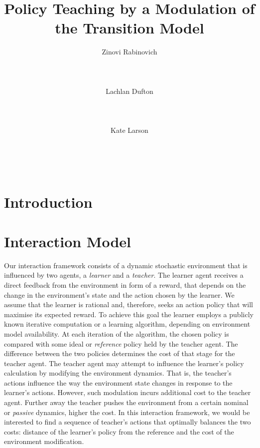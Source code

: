\documentclass[letterpaper]{aamas2009}
\author{\alignauthor Zinovi Rabinovich\\
  \affaddr{Electronics and Computer Science}\\
  \affaddr{University of Southampton}\\
  \affaddr{Southampton, United Kingdom}\\
  \email{zr@ecs.soton.ac.uk}
\alignauthor Lachlan Dufton\\ 
  \affaddr{Cheriton School of Computer Science}\\
  \affaddr{University of Waterloo}\\
  \affaddr{Waterloo, Canada}\\
  \email{ltdufton@cs.uwaterloo.ca}
\alignauthor Kate Larson\\
  \affaddr{Cheriton School of Computer Science}\\
  \affaddr{University of Waterloo}\\
  \affaddr{Waterloo, Canada}\\
  \email{klarson@cs.uwaterloo.ca}
}
\title{Policy  Teaching by a Modulation of the Transition Model}
\begin{document}
\maketitle

\section{Introduction}
\nocite{taylor_PhD_2008}
\nocite{taylor_stone_2009}
\nocite{rached_alajaji_campbell_2004}
\nocite{fleming_hernandez-hernandez_CDC_97}
\nocite{todorov_2009_framework_sup}
\nocite{todorov_2009_framework}
\nocite{ng_russell_2000}
\nocite{zhang_parkes_2008}
\nocite{zhang_parkes_2009_ed}
\nocite{dufton_larson_2009}
\nocite{banerjee_peng_2005}

\section{Interaction Model}
Our interaction framework consists of a dynamic stochastic environment
that is influenced by two agents, a {\em learner} and a {\em
  teacher}. The learner agent receives a direct feedback from the
environment in form of a reward, that depends on the change in the
environment's state and the action chosen by the learner. We assume
that the learner is rational and, therefore, seeks an action policy
that will maximise its expected reward. To achieve this goal the
learner employs a publicly known iterative computation or a learning
algorithm, depending on environment model availability. At each
iteration of the algorithm, the chosen policy is compared with some
ideal or {\em reference} policy held by the teacher agent. The
difference between the two policies determines the cost of that stage
for the teacher agent. The teacher agent may attempt to influence the
learner's policy calculation by modifying the environment
dynamics. That is, the teacher's actions influence the way the
environment state changes in response to the learner's
actions. However, such modulation incurs additional cost to the
teacher agent. Further away the teacher pushes the environment from a
certain nominal or {\em passive} dynamics, higher the cost. In this
interaction framework, we would be interested to find a sequence of
teacher's actions that optimally balances the two costs: distance of
the learner's policy from the reference and the cost of the
environment modification.
\end{document}
